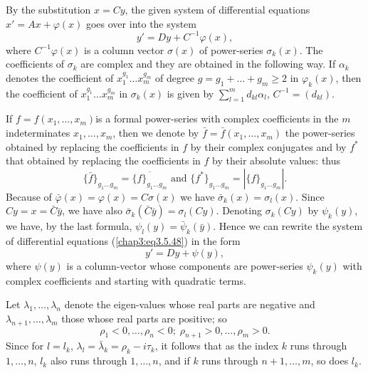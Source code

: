 By the substitution $x = Cy$, the given system of differential
equations $x' = Ax + \varphi (x)$ goes over into the system  
\begin{equation*}
y' = Dy + C^{-1} \varphi (x), \tag{3.5.48}\label{chap3:eq3.5.48} 
\end{equation*}
where $C^{-1}\varphi(x)$ is a column vector $\sigma(x)$ of
power-series $\sigma_k(x)$. The coefficients of $\sigma_k$ are complex
and they are obtained in the following way. If $\alpha_k$ denotes the
coefficient of $x^{g_1}_1 \ldots x^{g_m}_m$ of degree $g = g_1 +
\ldots + g_m \geq 2 $ in $\varphi_k(x)$, then the coefficient of
$x^{g_1}_1 \ldots x^{g_m}_m$ in $\sigma_k (x)$ is given by
$\sum\limits^m_{l=1} d_{kl} \alpha_l$, $C^{-1} = (d_{kl})$. 

If $f = f(x_1, \ldots, x_m)$\pageoriginale is a formal power-series
with complex coefficients in the $m$ indeterminates $x_1, \ldots,
x_m$, then we denote by $\bar{f} = \bar{f} (x_1, \ldots, x_m)$ the
power-series obtained by replacing the coefficients in $f$ by their
complex conjugates and by $f^*$ that obtained by replacing the
coefficients in $f$ by their absolute values: thus 
$$
\{\bar{f}\}_{g_1 \ldots g_m} = \overline{\{f\}_{g_1 \ldots g_m}}
\text{ and } \{f^*\}_{g_1 \ldots g_m} = |\{f\}_{g_1 \ldots g_m}|. 
$$
Because of $\bar{\varphi} (x) = \varphi (x) =  C \sigma (x)$ we have
$\bar{\sigma}_k(x) = \sigma_l (x)$. Since $Cy = x = \bar{C} \bar{y}$,
we have also $\bar{\sigma}_k (\bar{C} \bar{y}) =
\sigma_l(Cy)$. Denoting $\sigma_k(Cy)$ by $\psi_k(y)$, we have, by the
last formula, $\psi_l(y) = \bar{\psi}_k(\bar{y})$. Hence we can
rewrite the system of differential equations (\ref{chap3:eq3.5.48}) in
the form 
\begin{equation*}
y' = Dy + \psi (y), \tag{3.5.49}\label{chap3:eq3.5.49}
\end{equation*}
where $\psi(y)$ is a column-vector whose components are power-series
$\psi_k(y)$ with complex coefficients and starting with quadratic
terms. 

Let $\lambda_1, \ldots, \lambda_n$ denote the eigen-values whose real
parts are negative and $\lambda_{n+1}, \ldots, \lambda_m$ those whose
real parts are positive; so  
\begin{equation*}
\rho_1 < 0, \ldots, \rho_n < 0; \; \rho_{n+1} > 0, \ldots, \rho_m >
0. 
\tag{3.5.50}\label{chap3:eq3.5.50}
\end{equation*}
Since for $l = l_k$, $\lambda_l = \bar{\lambda}_k = \rho_k - i
\tau_k$, it follows that as the index $k$ runs through $1, \ldots, n$,
$l_k$ also runs through $1, \ldots, n$, and if $k$ runs through $n+1,
\ldots, m$, so does $l_k$.  

